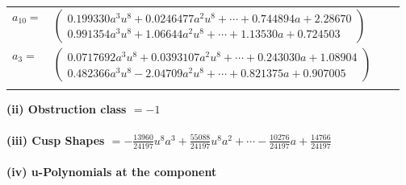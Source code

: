 \documentclass[1p]{elsarticle_modified}
\theoremstyle{definition}
\begin{document}
\begin{tabular}{m{7pt} m{180pt} m{7pt} m{180pt} }
\flushright $a_{10}=$&$\begin{pmatrix}0.199330 a^{3} u^{8}+0.0246477 a^{2} u^{8}+\cdots+0.744894 a+2.28670\\0.991354 a^{3} u^{8}+1.06644 a^{2} u^{8}+\cdots+1.13530 a+0.724503\end{pmatrix}$ \\
\flushright $a_{3}=$&$\begin{pmatrix}0.0717692 a^{3} u^{8}+0.0393107 a^{2} u^{8}+\cdots+0.243030 a+1.08904\\0.482366 a^{3} u^{8}-2.04709 a^{2} u^{8}+\cdots+0.821375 a+0.907005\end{pmatrix}$\\&\end{tabular}
\flushleft \textbf{(ii) Obstruction class $= -1$}\\~\\
\flushleft \textbf{(iii) Cusp Shapes $= -\frac{13960}{24197} u^8 a^3+\frac{55088}{24197} u^8 a^2+\cdots-\frac{10276}{24197} a+\frac{14766}{24197}$}\\~\\
\newpage\renewcommand{\arraystretch}{1}
\flushleft \textbf{(iv) u-Polynomials at the component}\newline \\
\end{document}

